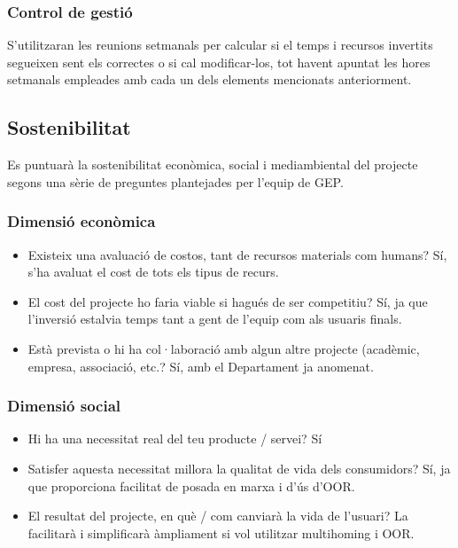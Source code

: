 \documentclass[11pt]{article}
\begin{document}
\subsubsection{Control de gestió}
S’utilitzaran les reunions setmanals per calcular si el temps i recursos invertits segueixen sent els correctes o si cal modificar-los, tot havent apuntat les hores setmanals empleades amb cada un dels elements mencionats anteriorment.

\subsection{Sostenibilitat}
Es puntuarà la sostenibilitat econòmica, social i mediambiental del projecte segons una sèrie de preguntes plantejades per l’equip de GEP.
\subsubsection{Dimensió econòmica}
\begin{itemize}
\item Existeix una avaluació de costos, tant de recursos materials com humans? Sí, s’ha avaluat el cost de tots els tipus de recurs.
\item El cost del projecte ho faria viable si hagués de ser competitiu? Sí, ja que l’inversió estalvia temps tant a gent de l’equip com als usuaris finals.
\item Està prevista o hi ha col·laboració amb algun altre projecte (acadèmic, empresa, associació, etc.? Sí, amb el Departament ja anomenat.
\end{itemize}
\subsubsection{Dimensió social}
\begin{itemize}
\item Hi ha una necessitat real del teu producte / servei? Sí
\item Satisfer aquesta necessitat millora la qualitat de vida dels consumidors? Sí, ja que proporciona facilitat de posada en marxa i d’ús d’OOR.
\item El resultat del projecte, en què / com canviarà la vida de l'usuari?  La facilitarà i simplificarà àmpliament si vol utilitzar multihoming i OOR.
\end{itemize}
\end{document}
